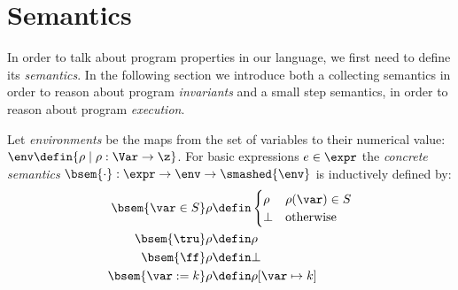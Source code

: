 \section{Semantics}

In order to talk about program properties in our language, we first
need to define its \emph{semantics}. In the following section we
introduce both a collecting semantics in order to reason about program
\emph{invariants} and a small step semantics, in order to reason about
program \emph{execution}.%

\begin{definition}
  Let \emph{environments} be the maps from the set of variables to
  their numerical value:
  \(\env \defin \{\rho \mid \rho : \Var \to \z\}\). For basic
  expressions \(e \in \expr\) the \emph{concrete semantics}
  \(\bsem{ \cdot} : \expr \to \env \to \smashed{\env}\) is
  inductively defined by:
  \begin{align*}
    \bsem{\var\in S} \rho & \defin \begin{cases} \rho & \rho(\var)\in S \\ \bot & \text{otherwise} \end{cases} \\
    \bsem{\tru} \rho & \defin \rho \\
    \bsem{\ff} \rho & \defin \bot \\
    \bsem{\var:= k} \rho & \defin \rho [\var\mapsto k] \\

\end{align*}
\end{definition}
